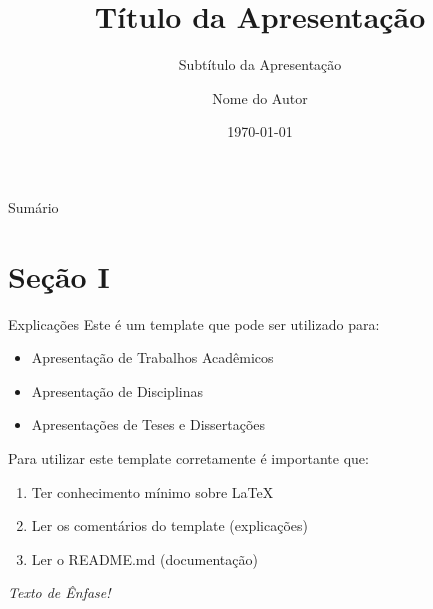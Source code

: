 \documentclass{libs/ufc_format}
\title[short title]{\textbf{Título da Apresentação}}
\subtitle{Subtítulo da Apresentação}
\author{Nome do Autor}
\institute[UFC]{
    \ufc
}
\date{\today}
\begin{document}


\begin{frame}{}
    \maketitle
\end{frame}

\begin{frame}{Sumário}
    \tableofcontents
\end{frame}

\section{Seção I}
\begin{frame}{Explicações}
    Este é um template que pode ser utilizado para:
    \begin{itemize}
        \item Apresentação de Trabalhos Acadêmicos
        \item Apresentação de Disciplinas
        \item Apresentações de Teses e Dissertações
    \end{itemize}

    \vspace{0.4cm} %
    
    Para utilizar este template corretamente é importante que:
    \begin{enumerate}
        \item Ter conhecimento mínimo sobre LaTeX
        \item Ler os comentários do template (explicações)
        \item Ler o README.md (documentação)
    \end{enumerate}

    \vspace{0.2cm}

     \emph{Texto de Ênfase!}
\end{frame}

\end{document}
